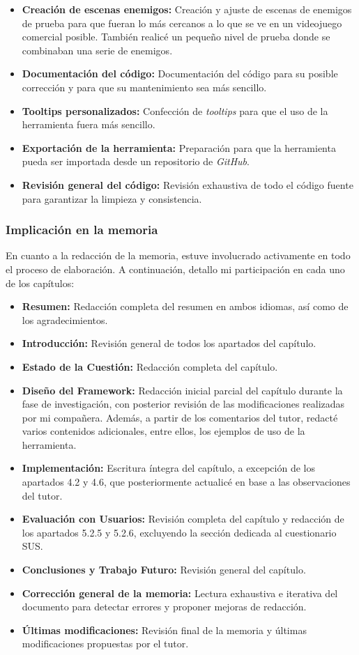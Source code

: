 \begin{itemize}
	\item \textbf{Creación de escenas enemigos:} Creación y ajuste de escenas de enemigos de prueba para que fueran lo más cercanos a lo que se ve en un videojuego comercial posible. También realicé un pequeño nivel de prueba donde se combinaban una serie de enemigos.
	\item \textbf{Documentación del código:} Documentación del código para su posible corrección y para que su mantenimiento sea más sencillo.
	\item \textbf{Tooltips personalizados:} Confección de \textit{tooltips} para que el uso de la herramienta fuera más sencillo.
	\item \textbf{Exportación de la herramienta:} Preparación para que la herramienta pueda ser importada desde un repositorio de \textit{GitHub}.
  	\item \textbf{Revisión general del código:} Revisión exhaustiva de todo el código fuente para garantizar la limpieza y consistencia.
\end{itemize}
\subsubsection*{Implicación en la memoria}
En cuanto a la redacción de la memoria, estuve involucrado activamente en todo el proceso de elaboración. A continuación, detallo mi participación en cada uno de los capítulos:

\begin{itemize}
 	\item \textbf{Resumen:} Redacción completa del resumen en ambos idiomas, así como de los agradecimientos.
 	\item \textbf{Introducción:} Revisión general de todos los apartados del capítulo.
 	\item \textbf{Estado de la Cuestión:} Redacción completa del capítulo.
 	\item \textbf{Diseño del Framework:} Redacción inicial parcial del capítulo durante la fase de investigación, con posterior revisión de las modificaciones realizadas por mi compañera. Además, a partir de los comentarios del tutor, redacté varios contenidos adicionales, entre ellos, los ejemplos de uso de la herramienta.
 	\item \textbf{Implementación:} Escritura íntegra del capítulo, a excepción de los apartados 4.2 y 4.6, que posteriormente actualicé en base a las observaciones del tutor.
 	\item \textbf{Evaluación con Usuarios:} Revisión completa del capítulo y redacción de los apartados 5.2.5 y 5.2.6, excluyendo la sección dedicada al cuestionario SUS.
 	\item \textbf{Conclusiones y Trabajo Futuro:} Revisión general del capítulo.
 	\item \textbf{Corrección general de la memoria:} Lectura exhaustiva e iterativa del documento para detectar errores y proponer mejoras de redacción.
	\item \textbf{Últimas modificaciones:} Revisión final de la memoria y últimas modificaciones propuestas por el tutor.
\end{itemize}
